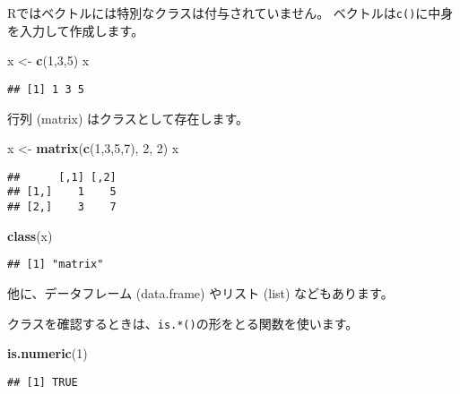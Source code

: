 \documentclass[]{bxjsarticle}
\newenvironment{Shaded}{\begin{snugshade}}{\end{snugshade}}
\newcommand{\DecValTok}[1]{\textcolor[rgb]{0.00,0.00,0.81}{#1}}
\newcommand{\KeywordTok}[1]{\textcolor[rgb]{0.13,0.29,0.53}{\textbf{#1}}}
\newcommand{\NormalTok}[1]{#1}
\newcommand{\StringTok}[1]{\textcolor[rgb]{0.31,0.60,0.02}{#1}}
\begin{document}
Rではベクトルには特別なクラスは付与されていません。
ベクトルは\texttt{c()}に中身を入力して作成します。

\begin{Shaded}
\begin{Highlighting}[]
\NormalTok{x <-}\StringTok{ }\KeywordTok{c}\NormalTok{(}\DecValTok{1}\NormalTok{,}\DecValTok{3}\NormalTok{,}\DecValTok{5}\NormalTok{)}
\NormalTok{x}
\end{Highlighting}
\end{Shaded}

\begin{verbatim}
## [1] 1 3 5
\end{verbatim}

行列 (matrix) はクラスとして存在します。

\begin{Shaded}
\begin{Highlighting}[]
\NormalTok{x <-}\StringTok{ }\KeywordTok{matrix}\NormalTok{(}\KeywordTok{c}\NormalTok{(}\DecValTok{1}\NormalTok{,}\DecValTok{3}\NormalTok{,}\DecValTok{5}\NormalTok{,}\DecValTok{7}\NormalTok{), }\DecValTok{2}\NormalTok{, }\DecValTok{2}\NormalTok{)}
\NormalTok{x}
\end{Highlighting}
\end{Shaded}

\begin{verbatim}
##      [,1] [,2]
## [1,]    1    5
## [2,]    3    7
\end{verbatim}

\begin{Shaded}
\begin{Highlighting}[]
\KeywordTok{class}\NormalTok{(x)}
\end{Highlighting}
\end{Shaded}

\begin{verbatim}
## [1] "matrix"
\end{verbatim}

他に、データフレーム (data.frame) やリスト (list) などもあります。

クラスを確認するときは、\texttt{is.*()}の形をとる関数を使います。

\begin{Shaded}
\begin{Highlighting}[]
\KeywordTok{is.numeric}\NormalTok{(}\DecValTok{1}\NormalTok{)}
\end{Highlighting}
\end{Shaded}

\begin{verbatim}
## [1] TRUE
\end{verbatim}
\end{document}
